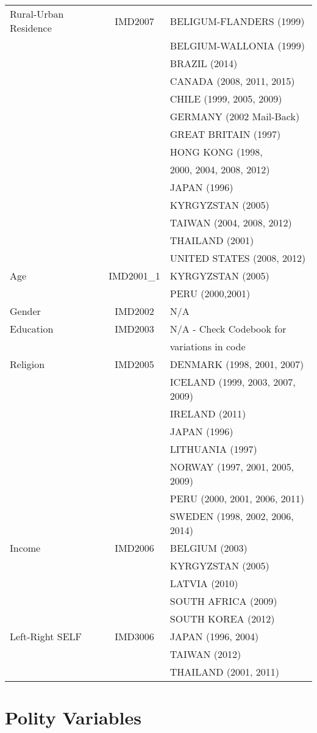 \documentclass[12pt, titlepage]{article}
\begin{document}
\begin{center}
\begin{longtable}{lcl}
		Rural-Urban Residence&IMD2007&BELIGUM-FLANDERS (1999) \\
		&&BELGIUM-WALLONIA (1999)\\
		&&BRAZIL (2014)\\
		&&CANADA (2008, 2011, 2015)\\
		&&CHILE (1999, 2005, 2009)\\
		&&GERMANY (2002 Mail-Back)\\
		&&GREAT BRITAIN (1997)\\
		&&HONG KONG (1998,\\
		&& 2000, 2004, 2008, 2012)\\
		&&JAPAN (1996)\\
		&&KYRGYZSTAN (2005)\\
		&&TAIWAN (2004, 2008, 2012)\\
		&&THAILAND (2001)\\
		&&UNITED STATES (2008, 2012)\\
	\hline
		Age&IMD2001\_1&KYRGYZSTAN (2005)\\
		&&PERU (2000,2001)\\
	\hline
	Gender&IMD2002&N/A\\
	\hline
	Education&IMD2003&N/A - Check Codebook for \\
	&& variations in code\\
	\hline
	Religion&IMD2005&DENMARK (1998, 2001, 2007)\\
	&&ICELAND (1999, 2003, 2007, 2009)\\
	&&IRELAND (2011)\\
	&&JAPAN (1996)\\
	&&LITHUANIA (1997)\\
	&&NORWAY (1997, 2001, 2005, 2009)\\
	&&PERU (2000, 2001, 2006, 2011)\\
	&&SWEDEN (1998, 2002, 2006, 2014)\\
	\hline
	Income&IMD2006&BELGIUM (2003)\\
	&& KYRGYZSTAN (2005)\\
	&&LATVIA (2010)\\
	&&SOUTH AFRICA (2009)\\ 
	&&SOUTH KOREA (2012)\\
	\hline
	Left-Right SELF&IMD3006&JAPAN (1996, 2004)\\ 
	&&TAIWAN (2012)\\
	&&THAILAND (2001, 2011)\\
	\hline
\end{longtable}
\end{center}

\section{Polity Variables}
\end{document}
